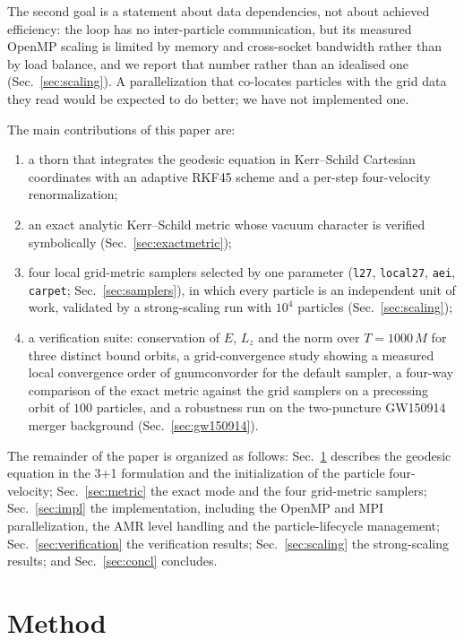 \documentclass[11pt]{article}
\newcommand{\num}[1]{\csname gnum#1\endcsname}
\begin{document}
The second goal is a statement about data dependencies, not about achieved
efficiency: the loop has no inter-particle communication, but its measured
OpenMP scaling is limited by memory and cross-socket bandwidth rather than
by load balance, and we report that number rather than an idealised one
(Sec.~\ref{sec:scaling}).  A parallelization that co-locates particles with
the grid data they read would be expected to do better; we have not
implemented one.

The main contributions of this paper are:
\begin{enumerate}
\item a thorn that integrates the geodesic equation in Kerr--Schild
  Cartesian coordinates with an adaptive RKF45 scheme and a per-step
  four-velocity renormalization;
\item an exact analytic Kerr--Schild metric whose vacuum character is
  verified symbolically (Sec.~\ref{sec:exactmetric});
\item four local grid-metric samplers selected by one parameter
  (\texttt{l27}, \texttt{local27}, \texttt{aei}, \texttt{carpet};
  Sec.~\ref{sec:samplers}), in which every particle is an independent
  unit of work, validated by a strong-scaling run with $10^4$ particles
  (Sec.~\ref{sec:scaling});
\item a verification suite: conservation of $E$, $L_z$ and the norm over
  $T=1000\,M$ for three distinct bound orbits, a grid-convergence study
  showing a measured local convergence order of \num{convorder}
  for the default sampler, a four-way comparison
  of the exact metric against the grid samplers on a precessing orbit of
  $100$ particles, and a robustness run on the two-puncture GW150914
  merger background (Sec.~\ref{sec:gw150914}).
\end{enumerate}

The remainder of the paper is organized as follows: Sec.~\ref{sec:method}
describes the geodesic equation in the 3+1 formulation and the
initialization of the particle four-velocity; Sec.~\ref{sec:metric} the
exact mode and the four grid-metric samplers; Sec.~\ref{sec:impl} the
implementation, including
the OpenMP and MPI parallelization, the AMR level handling and the
particle-lifecycle management;
Sec.~\ref{sec:verification} the verification results; Sec.~\ref{sec:scaling}
the strong-scaling results; and Sec.~\ref{sec:concl} concludes.

\section{Method}\label{sec:method}
\end{document}
